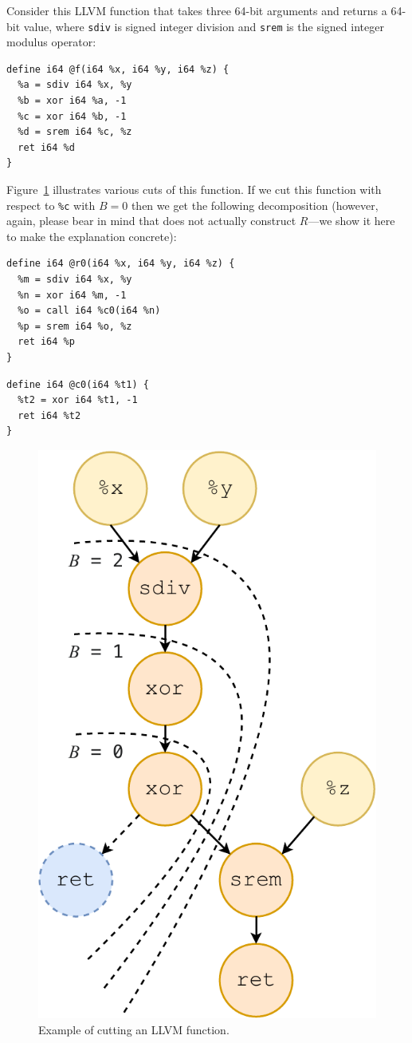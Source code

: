 Consider this LLVM function that takes three 64-bit arguments and
returns a 64-bit value, where \texttt{sdiv} is signed integer division
and \texttt{srem} is the signed integer modulus operator:


{\begin{quoting}
\begin{Verbatim}
define i64 @f(i64 %x, i64 %y, i64 %z) {
  %a = sdiv i64 %x, %y
  %b = xor i64 %a, -1
  %c = xor i64 %b, -1
  %d = srem i64 %c, %z
  ret i64 %d
}
\end{Verbatim}
\end{quoting}}

Figure~\ref{fig:cut-depth} illustrates various cuts of this function.
%
If we cut this function with respect to \texttt{\%c} with $B = 0$ then
we get the following decomposition (however, again, please bear in
mind that \minotaur{} does not actually construct $R$---we show it here to
make the explanation concrete):

{\begin{quoting}
\begin{Verbatim}
define i64 @r0(i64 %x, i64 %y, i64 %z) {
  %m = sdiv i64 %x, %y
  %n = xor i64 %m, -1
  %o = call i64 %c0(i64 %n)
  %p = srem i64 %o, %z
  ret i64 %p
}
\end{Verbatim}
\end{quoting}}
{\begin{quoting}
\begin{Verbatim}
define i64 @c0(i64 %t1) {
  %t2 = xor i64 %t1, -1
  ret i64 %t2
}
\end{Verbatim}
\end{quoting}}

\begin{figure}[tbp]
  \centering
  \includegraphics[width=0.6\linewidth]{figures/cut-depth.pdf}
  \caption{Example of cutting an LLVM function.}
  \label{fig:cut-depth}
\end{figure}

